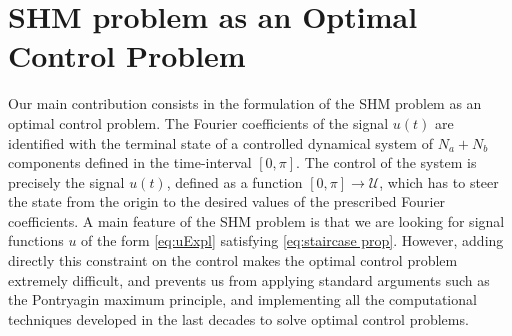 \documentclass[twocolumn]{autart}    %
\begin{document}
\begin{itemize}
\end{itemize}


\section{SHM problem as an Optimal Control Problem}\label{sec:Contributions}

Our main contribution consists in the formulation of the SHM problem as an optimal control problem. The Fourier coefficients of the signal $u(t)$ are identified with the terminal state of a controlled dynamical system of $N_a+N_b$ components defined in the time-interval $[0,\pi]$.  The control of the system is precisely the signal $u(t)$, defined as a function $[0,\pi]\to \mathcal{U}$, which has to steer the state from the origin to the desired values of the prescribed Fourier coefficients. A main feature of the SHM problem is that we are looking for signal functions $u$ of the form \eqref{eq:uExpl} satisfying \eqref{eq:staircase prop}. However, adding directly this constraint on the control makes the optimal control problem extremely difficult, and prevents us from applying standard arguments such as the Pontryagin maximum principle, and implementing all the computational techniques developed in the last decades to solve optimal control problems.
\end{document}

